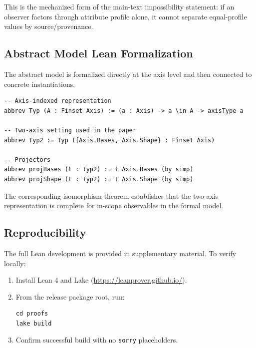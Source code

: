 This is the mechanized form of the main-text impossibility statement: if an observer factors through attribute profile alone, it cannot separate equal-profile values by source/provenance.

\subsection{Abstract Model Lean Formalization}\label{abstract-model-lean-formalization}

The abstract model is formalized directly at the axis level and then connected to concrete instantiations.

\begin{lstlisting}[style=lean]
-- Axis-indexed representation
abbrev Typ (A : Finset Axis) := (a : Axis) -> a \in A -> axisType a

-- Two-axis setting used in the paper
abbrev Typ2 := Typ ({Axis.Bases, Axis.Shape} : Finset Axis)

-- Projectors
abbrev projBases (t : Typ2) := t Axis.Bases (by simp)
abbrev projShape (t : Typ2) := t Axis.Shape (by simp)
\end{lstlisting}

The corresponding isomorphism theorem establishes that the two-axis representation is complete for in-scope observables in the formal model.

\subsection{Reproducibility}

The full Lean development is provided in supplementary material. To verify locally:
\begin{enumerate}
\item Install Lean 4 and Lake (\url{https://leanprover.github.io/}).
\item From the release package root, run:
\begin{lstlisting}[style=lean]
cd proofs
lake build
\end{lstlisting}
\item Confirm successful build with no \texttt{sorry} placeholders.
\end{enumerate}
